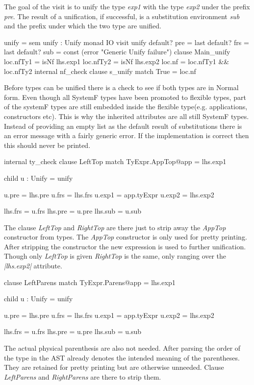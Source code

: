 The goal of the visit is to unify the type \emph{exp1} with the type \emph{exp2} under the prefix \emph{pre}. The result of a unification, if successful, is a substitution environment \emph{sub} and the prefix under which the two type are unified.

\begin{code}
unify = sem unify : Unify monad IO    
          visit unify
             default? pre  = last
             default? frs  = last
             default? sub  = const (error "Generic Unify failure")
             clause Main_unify
               loc.nfTy1  = isNf lhs.exp1
               loc.nfTy2  = isNf lhs.exp2
               loc.nf     = loc.nfTy1 && loc.nfTy2
               internal nf_check
                 clause s_unify
                   match True  = loc.nf
\end{code}
Before types can be unified there is a check to see if both types are in Normal form. Even though all SystemF types have been promoted to flexible types, part of the systemF types are still embedded inside the flexible type(e.g. applications, constructors etc). This is why the inherited attributes are all still SystemF types. Instead of providing an empty list as the default result of substitutions there is an error message with a fairly generic error. If the implementation is correct then this should never be printed.

\begin{code}
internal ty_check
  clause LeftTop
    match TyExpr.AppTop@app = lhs.exp1
    
    child u : Unify = unify
    
    u.pre    = lhs.pre
    u.frs    = lhs.frs
    u.exp1   = app.tyExpr
    u.exp2   = lhs.exp2
             
    lhs.frs  = u.frs
    lhs.pre  = u.pre
    lhs.sub  = u.sub
\end{code}
The clause \emph{LeftTop} and \emph{RightTop} are there just to strip away the \emph{AppTop} constructor from types. The \emph{AppTop} constructor is only used for pretty printing. After stripping the constructor the new expression is used to further unification. Though only \emph{LeftTop} is given \emph{RightTop} is the same, only ranging over the \emph{|lhs.exp2|} attribute.

\begin{code}
clause LeftParens
  match TyExpr.Parens@app = lhs.exp1
  
  child u : Unify = unify
  
  u.pre    = lhs.pre
  u.frs    = lhs.frs
  u.exp1   = app.tyExpr
  u.exp2   = lhs.exp2
           
  lhs.frs  = u.frs
  lhs.pre  = u.pre
  lhs.sub  = u.sub
\end{code}
The actual physical parenthesis are also not needed. After parsing the order of the type in the AST already denotes the intended meaning of the parentheses. They are retained for pretty printing but are otherwise unneeded. Clause \emph{LeftParens} and \emph{RightParens} are there to strip them.

